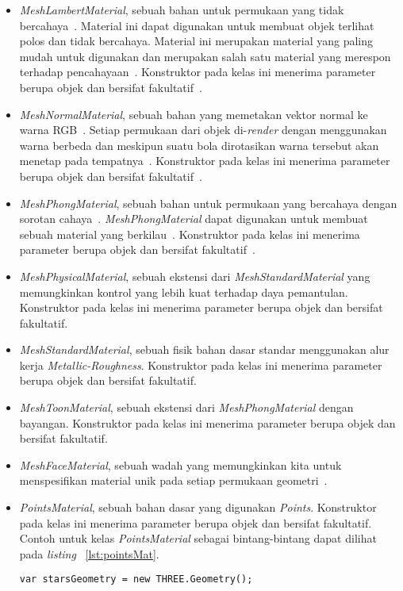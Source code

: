 \begin{itemize}
\begin{itemize}
		\item {\it MeshLambertMaterial}, sebuah bahan untuk permukaan yang tidak bercahaya~\cite{threejs}. Material ini dapat digunakan untuk membuat objek terlihat polos dan tidak bercahaya. Material ini merupakan material yang paling mudah untuk digunakan dan merupakan salah satu material yang merespon terhadap pencahayaan~\cite{learningThreejs}. Konstruktor pada kelas ini menerima parameter berupa objek dan bersifat fakultatif~\cite{threejs}.
		\item {\it MeshNormalMaterial}, sebuah bahan yang memetakan vektor normal ke warna RGB~\cite{threejs}. Setiap permukaan dari objek di-{\it render} dengan menggunakan warna berbeda dan meskipun suatu bola dirotasikan warna tersebut akan menetap pada tempatnya~\cite{learningThreejs}. Konstruktor pada kelas ini menerima parameter berupa objek dan bersifat fakultatif~\cite{threejs}.
		\item {\it MeshPhongMaterial}, sebuah bahan untuk permukaan yang bercahaya dengan sorotan cahaya~\cite{threejs}. {\it MeshPhongMaterial} dapat digunakan untuk membuat sebuah material yang berkilau~\cite{learningThreejs}. Konstruktor pada kelas ini menerima parameter berupa objek dan bersifat fakultatif~\cite{threejs}.
		\item {\it MeshPhysicalMaterial}, sebuah ekstensi dari {\it MeshStandardMaterial} yang memungkinkan kontrol yang lebih kuat terhadap daya pemantulan. Konstruktor pada kelas ini menerima parameter berupa objek dan bersifat fakultatif.
		\item {\it MeshStandardMaterial}, sebuah fisik bahan dasar standar menggunakan alur kerja {\it Metallic-Roughness}. Konstruktor pada kelas ini menerima parameter berupa objek dan bersifat fakultatif.
		\item {\it MeshToonMaterial}, sebuah ekstensi dari {\it MeshPhongMaterial} dengan bayangan. Konstruktor pada kelas ini menerima parameter berupa objek dan bersifat fakultatif.
		\item {\it MeshFaceMaterial}, sebuah wadah yang memungkinkan kita untuk menspesifikan material unik pada setiap permukaan geometri~\cite{learningThreejs}. 
		\item {\it PointsMaterial}, sebuah bahan dasar yang digunakan {\it Points}. Konstruktor pada kelas ini menerima parameter berupa objek dan bersifat fakultatif. Contoh untuk kelas {\it PointsMaterial} sebagai bintang-bintang dapat dilihat pada {\it listing} ~\ref{lst:pointsMat}.
\begin{lstlisting}[caption={Contoh penggunaan kelas {\it PointsMaterial}.}, label={lst:pointsMat},captionpos=b]
var starsGeometry = new THREE.Geometry();


\end{lstlisting}
\end{itemize}
\end{itemize}
